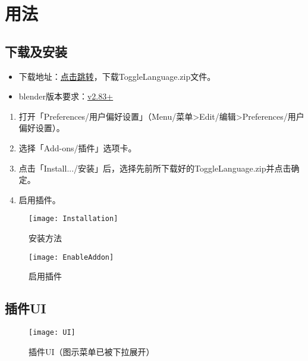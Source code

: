 \documentclass{../../PublicResources/DocClass}
\begin{document}
    \section{用法}

    \subsection{下载及安装}
    \par
    \begin{itemize}
        \item 下载地址：\href{https://github.com/Mister-Kin/ToggleLanguage/releases/latest}{点击跳转}，下载ToggleLanguage.zip文件。
        \item blender版本要求：\href{https://www.blender.org/download/}{v2.83+}
    \end{itemize}

    \begin{enumerate}
        \item 打开「Preferences/用户偏好设置」（Menu/菜单>Edit/编辑>Preferences/用户偏好设置）。
        \item 选择「Add-ons/插件」选项卡。
        \item 点击「Install.../安装」后，选择先前所下载好的ToggleLanguage.zip并点击确定。
        \item 启用插件。
    \end{enumerate}

    \begin{figure}[htbp]
        \begin{minipage}[t]{0.45\textwidth}
            \texttt{[image: Installation]}
            \caption{安装方法}
        \end{minipage}
        \qquad
        \begin{minipage}[t]{0.45\textwidth}
            \texttt{[image: EnableAddon]}
            \caption{启用插件}
        \end{minipage}
    \end{figure}

    \subsection{插件UI}
    \label{插件UI小节}
    \begin{figure}[htbp]
        \texttt{[image: UI]}
        \caption{插件UI（图示菜单已被下拉展开）}\label{插件UI}
    \end{figure}
\end{document}
